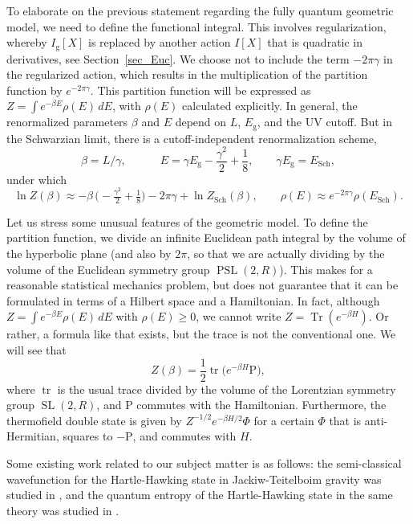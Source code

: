 \documentclass[11pt]{article}
\newcommand{\lt}{\left}
\newcommand{\rt}{\right}
\newcommand{\RR}{\mathbb{R}}
\DeclareMathOperator{\tr}{tr}
\DeclareMathOperator{\Tr}{Tr}
\DeclareMathOperator{\PSL}{PSL}
\DeclareMathOperator{\tSL}{\widetilde{\mathrm{SL}}}
\DeclareMathOperator{\Sch}{Sch}
\newcommand{\g}{\text{g}}
\newcommand{\Rho}{\mathrm{P}}
\def\widetilde#1{#1}%
\def\RR{R}
\begin{document}
To elaborate on the previous statement regarding the fully quantum geometric model, we need to define the functional integral. This involves regularization, whereby $I_{\g}[X]$ is replaced by another action $I[X]$ that is quadratic in derivatives, see Section~\ref{sec_Euc}. We choose not to include the term $-2\pi\gamma$ in the regularized action, which results in the multiplication of the partition function by $e^{-2\pi\gamma}$. This partition function will be expressed as $Z=\int e^{-\beta E}\rho(E)\,dE$, with $\rho(E)$ calculated explicitly. In general, the renormalized parameters $\beta$ and $E$ depend on $L$, $E_{\g}$, and the UV cutoff. But in the Schwarzian limit, there is a cutoff-independent renormalization scheme,
\begin{equation}
\beta=L/\gamma,\qquad\quad
E=\gamma E_{\g}-\frac{\gamma^2}{2}+\frac{1}{8},\qquad \gamma E_{\g}=E_{\Sch},
\end{equation}
under which
\begin{equation}
\ln Z(\beta)\approx -\beta\,\bigl(-\tfrac{\gamma^2}{2}+\tfrac{1}{8}\bigr)
-2\pi\gamma + \ln Z_{\Sch}(\beta),\qquad
\rho(E)\approx e^{-2\pi\gamma}\rho(E_{\Sch}).
\end{equation}

Let us stress some unusual features of the geometric model. To define the partition function, we divide an infinite Euclidean path integral by the volume of the hyperbolic plane (and also by $2\pi$, so that we are actually dividing by the volume of the Euclidean symmetry group $\PSL(2,\RR)$). This makes for a reasonable statistical mechanics problem, but does not guarantee that it can be formulated in terms of a Hilbert space and a Hamiltonian. In fact, although $Z=\int e^{-\beta E}\rho(E)\,dE$ with $\rho(E)\geq 0$, we cannot write $Z=\Tr\lt(e^{-\beta H}\rt)$. Or rather, a formula like that exists, but the trace is not the conventional one. We will see that
\begin{equation}
Z(\beta)=\frac{1}{2}\tr\bigl(e^{-\beta H}\Rho\bigr),
\end{equation}
where $\tr$ is the usual trace divided by the volume of the Lorentzian symmetry group $\tSL(2,\RR)$, and $\Rho$ commutes with the Hamiltonian. Furthermore, the thermofield double state is given by $Z^{-1/2}e^{-\beta H/2}\Phi$ for a certain $\Phi$ that is anti-Hermitian, squares to $-\Rho$, and commutes with $H$.

Some existing work related to our subject matter is as follows: the semi-classical wavefunction for the Hartle-Hawking state in Jackiw-Teitelboim gravity was studied in \cite{HaJa18}, and the quantum entropy of the Hartle-Hawking state in the same theory was studied in \cite{Lin18}.
\end{document}
